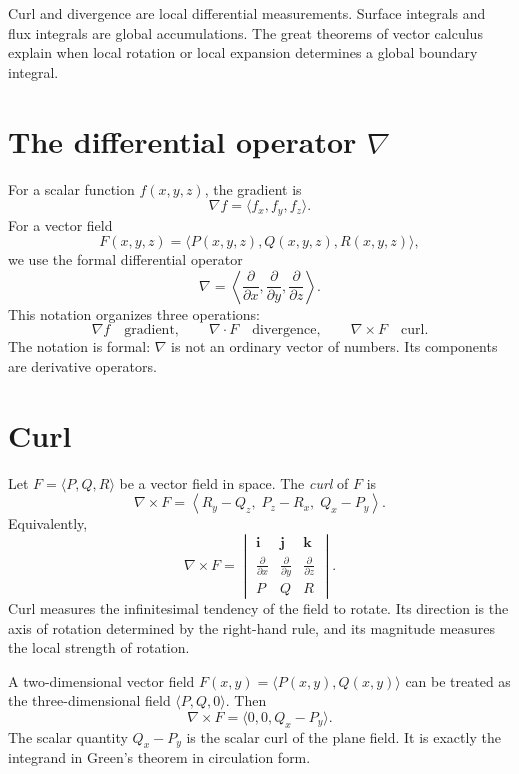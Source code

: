 \documentclass[11pt]{article}
\newcommand{\ii}{\mathbf i}
\newcommand{\jj}{\mathbf j}
\newcommand{\kk}{\mathbf k}
\newcommand{\grad}{\nabla}
\begin{document}
\begin{notebox}
Curl and divergence are local differential measurements. Surface integrals and flux integrals are global accumulations. The great theorems of vector calculus explain when local rotation or local expansion determines a global boundary integral.
\end{notebox}

\section{The differential operator $\nabla$}

For a scalar function $f(x,y,z)$, the gradient is
\[
\grad f=\langle f_x,f_y,f_z\rangle.
\]
For a vector field
\[
F(x,y,z)=\langle P(x,y,z),Q(x,y,z),R(x,y,z)\rangle,
\]
we use the formal differential operator
\[
\grad=\left\langle \frac{\partial}{\partial x},\frac{\partial}{\partial y},\frac{\partial}{\partial z}\right\rangle.
\]
This notation organizes three operations:
\[
\grad f \quad \text{gradient},\qquad
\grad\cdot F \quad \text{divergence},\qquad
\grad\times F \quad \text{curl}.
\]
The notation is formal: $\grad$ is not an ordinary vector of numbers. Its components are derivative operators.

\section{Curl}

Let $F=\langle P,Q,R\rangle$ be a vector field in space. The \emph{curl} of $F$ is
\[
\grad\times F=\left\langle R_y-Q_z,\; P_z-R_x,\; Q_x-P_y\right\rangle.
\]
Equivalently,
\[
\grad\times F=
\begin{vmatrix}
\ii & \jj & \kk\\
\frac{\partial}{\partial x} & \frac{\partial}{\partial y} & \frac{\partial}{\partial z}\\
P & Q & R
\end{vmatrix}.
\]
Curl measures the infinitesimal tendency of the field to rotate. Its direction is the axis of rotation determined by the right-hand rule, and its magnitude measures the local strength of rotation.

\begin{importantbox}
A two-dimensional vector field $F(x,y)=\langle P(x,y),Q(x,y)\rangle$ can be treated as the three-dimensional field $\langle P,Q,0\rangle$. Then
\[
\grad\times F=\langle 0,0,Q_x-P_y\rangle.
\]
The scalar quantity $Q_x-P_y$ is the scalar curl of the plane field. It is exactly the integrand in Green's theorem in circulation form.
\end{importantbox}
\end{document}

